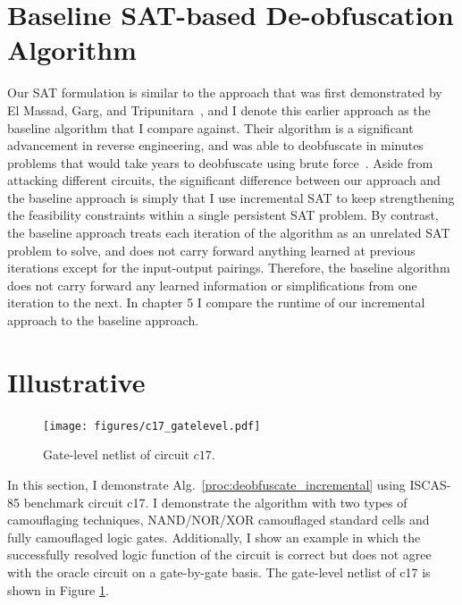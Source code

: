 \documentclass[proposal]{umassthesis}  %
\begin{document}

\section{Baseline SAT-based De-obfuscation Algorithm}
Our SAT formulation is similar to the approach that was first demonstrated by El Massad, Garg, and Tripunitara~\cite{elmassad-15}, and I denote this earlier approach as the baseline algorithm that I compare against. Their algorithm is a significant advancement in reverse engineering, and was able to deobfuscate in minutes problems that would take years to deobfuscate using brute force~\cite{rajendran-13}. Aside from attacking different circuits, the significant difference between our approach and the baseline approach is simply that I use incremental SAT to keep strengthening the feasibility constraints within a single persistent SAT problem. By contrast, the baseline approach treats each iteration of the algorithm as an unrelated SAT problem to solve, and does not carry forward anything learned at previous iterations except for the input-output pairings. Therefore, the baseline algorithm does not carry forward any learned information or simplifications from one iteration to the next. In chapter 5 I compare the runtime of our incremental approach to the baseline approach.















\section{Illustrative}
\begin{figure}[t] 
\begin{center}
\texttt{[image: figures/c17\_gatelevel.pdf]}
\caption{Gate-level netlist of circuit $c17$.}
\label{fig:c17_original}
\end{center}
\end{figure}

In this section, I demonstrate Alg.~\ref{proc:deobfuscate_incremental} using ISCAS-85 benchmark circuit c17. I demonstrate the algorithm with two types of camouflaging techniques, NAND/NOR/XOR camouflaged standard cells and fully camouflaged logic gates. Additionally, I show an example in which the successfully resolved logic function of the circuit is correct but does not agree with the oracle circuit on a gate-by-gate basis. The gate-level netlist of c17 is shown in Figure \ref{fig:c17_original}.
\end{document}
